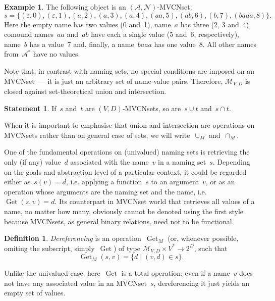 \documentclass{article}
\theoremstyle{definition}
\newtheorem{Df}{Definition}
\newtheorem{St}{Statement}
\newtheorem{Ex}{Example}
\newcommand{\setcharmvcn}{M}
\newcommand{\setsymbol}[3]{\mathcal{#1}_{#2,#3}}
\newcommand{\setmvcn}[2]{\setsymbol{\setcharmvcn}{#1}{#2}}
\newcommand{\seta}{\mathcal{A}}
\newcommand{\setn}{\mathcal{N}}
\newcommand{\deref}{\operatorname{Get}}
\begin{document}
\begin{Ex}\label{ex:mvcn}
The following object is an $(\seta, \setn)$-MVCNset:
\[
  s = \{
    (\varepsilon, 0),
    (\varepsilon, 1),
    (a,           2),
    (a,           3),
    (a,           4),
    (aa,          5),
    (ab,          6),
    (b,           7),
    (baaa,        8)
  \} .
\]
Here the empty name has two values (0 and~1), name~$a$ has three (2, 3 and~4),
comound names~$aa$ and~$ab$ have each a single value (5 and~6, respectively),
name~$b$ has a value~7 and, finally, a name~$baaa$ has one value~8. All other
names from~$\seta^\ast$ have no values.
\end{Ex}

Note that, in contrast with naming sets, no special conditions are imposed
on an MVCNset~--- it is just an arbitrary set of name-value pairs.
Therefore, $\setmvcn{V}{D}$ is closed against set-theore\-tical union
and intersection.
\begin{St}\label{st:mvcn-setop}
If~$s$ and~$t$ are $(V,D)$-MVCNsets, so are~$s\cup t$ and~$s\cap t$.
\end{St}

When it is important to emphasise that union and intersection are operations
on MVCNsets rather than on general case of sets, we will
write~$\cup_\setcharmvcn$ and~$\cap_\setcharmvcn$.

One of the fundamental operations on (univalued) naming sets is retrieving
the only (if any) value~$d$ associated with the name~$v$ in a naming
set~$s$.  Depending on the goals and abstraction level of a particular
context, it could be regarded either as~$s(v)=d$, i.e. applying a function~$s$
to an argument~$v$, or as an operation whose arguments are the naming set and
the name, i.e.~$\deref(s, v)=d$. Its counterpart in MVCNset world that
retrieves all values of a name, no matter how many, obviously cannot be denoted
using the first style because MVCNsets, as general binary relations, need not
to be functional.

\begin{Df}\label{df:mvcn-dereferencing}
\emph{Dereferencing} is an operation~$\deref_\setcharmvcn$ (or, whenever
possible, omiting the subscript, simply~$\deref$) of type
$\setmvcn{V}{D} \times V^\ast \to 2^D$,
such that
\[
  \deref_\setcharmvcn(s, v) = \{ d \mid (v, d) \in s \} .
\]
\end{Df}

Unlike the univalued case, here~$\deref$ is a total operation: even if a
name~$v$ does not have any associated value in an MVCNset~$s$, dereferencing
it just yields an empty set of values.
\end{document}
